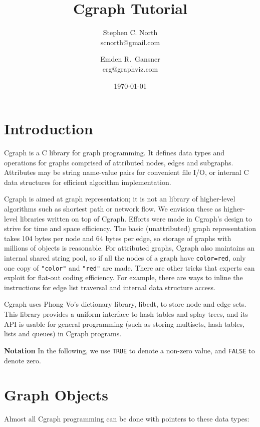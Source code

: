 \documentclass[11pt,letterpaper]{article}
\author{Stephen C. North \\ 
{\small scnorth@gmail.com}
\and Emden R.~Gansner \\
{\small erg@graphviz.com}
}
\title{Cgraph Tutorial}
\date{\today}
\begin{document}
\maketitle  
\newpage
\tableofcontents
\newpage

\section{Introduction}
\label{sec:introduction}
Cgraph is a C library for graph programming.
It defines data types and operations for graphs comprised
of attributed nodes, edges and subgraphs.
Attributes may be string name-value pairs for convenient
file I/O, or internal C data structures for efficient algorithm
implementation.

Cgraph is aimed at graph representation; it is not an library of
higher-level algorithms such as shortest path or network flow.
We envision these as higher-level libraries written on top of
Cgraph.  Efforts were made in Cgraph's design to strive
for time and space efficiency.  The basic (unattributed) graph representation
takes 104 bytes per node and 64 bytes per edge, so storage of graphs with
millions of objects is reasonable.  For attributed graphs, Cgraph also
maintains an internal shared string pool, so if all the nodes of a graph
have \verb'color=red', only one copy of \verb'"color"' and \verb'"red"'
are made.  There are other tricks that experts can exploit for
flat-out coding efficiency.  For example, there are ways to inline the
instructions for edge list traversal and internal data structure access.

Cgraph uses Phong Vo's dictionary library, libcdt, to store node
and edge sets.  This library provides a uniform interface to hash
tables and splay trees, and its API is usable for general programming
(such as storing  multisets, hash tables, lists and queues) in Cgraph
programs.

{\bf Notation} In the following, we use \verb"TRUE" to denote a non-zero
value, and \verb"FALSE" to denote zero.
\section{Graph Objects}
\label{sec:graphobjects}
Almost all Cgraph programming can be done with pointers to
these data types:
\end{document}
